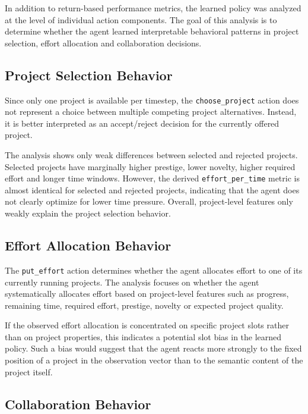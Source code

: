 \documentclass[english,bachelor]{hsluthesis}
\begin{document}
In addition to return-based performance metrics, the learned policy was analyzed at the level of individual action components. The goal of this analysis is to determine whether the agent learned interpretable behavioral patterns in project selection, effort allocation and collaboration decisions.

\subsection{Project Selection Behavior}

Since only one project is available per timestep, the \texttt{choose\_project} action does not represent a choice between multiple competing project alternatives. Instead, it is better interpreted as an accept/reject decision for the currently offered project.

The analysis shows only weak differences between selected and rejected projects. Selected projects have marginally higher prestige, lower novelty, higher required effort and longer time windows. However, the derived \texttt{effort\_per\_time} metric is almost identical for selected and rejected projects, indicating that the agent does not clearly optimize for lower time pressure. Overall, project-level features only weakly explain the project selection behavior.

\subsection{Effort Allocation Behavior}

The \texttt{put\_effort} action determines whether the agent allocates effort to one of its currently running projects. The analysis focuses on whether the agent systematically allocates effort based on project-level features such as progress, remaining time, required effort, prestige, novelty or expected project quality.

If the observed effort allocation is concentrated on specific project slots rather than on project properties, this indicates a potential slot bias in the learned policy. Such a bias would suggest that the agent reacts more strongly to the fixed position of a project in the observation vector than to the semantic content of the project itself.

\subsection{Collaboration Behavior}
\end{document}
